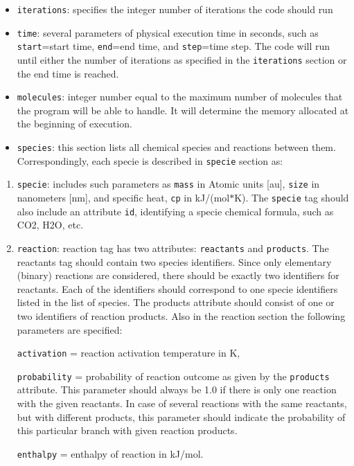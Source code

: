 \begin{itemize}
\item {\tt iterations}: specifies the integer number of iterations the code should run\item {\tt time}: several parameters of physical execution time in seconds, such as {\tt start}=start time, {\tt end}=end time, and {\tt step}=time step. The code will run until either the number of iterations as specified in the {\tt iterations} section or the end time is reached.\item {\tt molecules}: integer number equal to the maximum number of molecules that the program will be able to handle. It will determine the memory allocated at the beginning of execution.\item {\tt species}: this section lists all chemical species and reactions between them. Correspondingly, each specie is described in {\tt specie} section as:\end{itemize}
\begin{enumerate}
\item {\tt specie}: includes such parameters as {\tt mass} in Atomic units \mbox{[}au\mbox{]}, {\tt size} in nanometers \mbox{[}nm\mbox{]}, and specific heat, {\tt cp} in kJ/(mol$\ast$K). The {\tt specie} tag should also include an attribute {\tt id}, identifying a specie chemical formula, such as CO2, H2O, etc.\item {\tt reaction}: reaction tag has two attributes: {\tt reactants} and {\tt products}. The reactants tag should contain two species identifiers. Since only elementary (binary) reactions are considered, there should be exactly two identifiers for reactants. Each of the identifiers should correspond to one specie identifiers listed in the list of species. The products attribute should consist of one or two identifiers of reaction products. Also in the reaction section the following parameters are specified:\par
 {\tt activation} = reaction activation temperature in K, \par
 {\tt probability} = probability of reaction outcome as given by the {\tt products} attribute. This parameter should always be 1.0 if there is only one reaction with the given reactants. In case of several reactions with the same reactants, but with different products, this parameter should indicate the probability of this particular branch with given reaction products. \par
 {\tt enthalpy} = enthalpy of reaction in kJ/mol.\end{enumerate}
